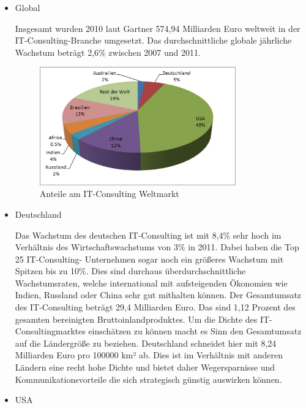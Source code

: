 \begin{itemize} 
\item {Global}

Insgesamt wurden 2010 laut Gartner 574,94 Milliarden Euro weltweit in der IT-Consulting-Branche umgesetzt. \cite{itConsultingGlobal} Das durchschnittliche globale jährliche Wachstum beträgt 2,6\% zwischen 2007 und 2011.\cite{globalGartner}

\begin{figure}
  \centering
  \includegraphics[width=0.8\textwidth]{images/global_revenue_share.jpg} 
  \caption{Anteile am IT-Consulting Weltmarkt} \label{fig:weltmarkt} 
\end{figure}


\item {Deutschland}

Das Wachstum des deutschen IT-Consulting ist mit 8,4\% sehr hoch im Verhältnis des Wirtschaftswachstums von 3\% in 2011.\cite{statGer2} Dabei haben die Top 25 IT-Consulting- Unternehmen sogar noch ein größeres Wachstum mit Spitzen bis zu 10\%. \cite[6]{topITB} Dies sind durchaus überdurchschnittliche Wachstumsraten, welche international mit aufsteigenden Ökonomien wie Indien, Russland oder China sehr gut mithalten können. Der Gesamtumsatz des IT-Consulting beträgt 29,4 Milliarden Euro.  Das sind 1,12 Prozent des gesamten bereinigten Bruttoinlandproduktes. \cite{statGer} Um die Dichte des IT-Consultingmarktes einschätzen zu können macht es Sinn den Gesamtumsatz auf die Ländergröße zu beziehen. 
Deutschland schneidet hier mit 8,24 Milliarden Euro pro 100000 km² ab. Dies ist im Verhältnis mit anderen Ländern eine recht hohe Dichte und bietet daher Wegersparnisse und Kommunikationsvorteile die sich strategisch günstig auswirken können.

\item {USA}


\end{itemize}
